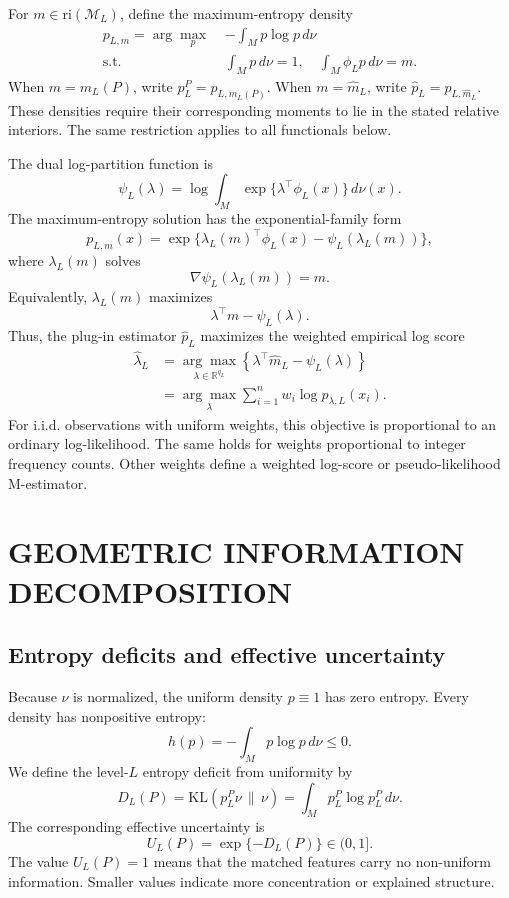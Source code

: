 \documentclass[twoside]{article}
\theoremstyle{definition}
\theoremstyle{remark}
\newcommand{\M}{\mathcal M}
\newcommand{\R}{\mathbb R}
\newcommand{\KL}{\mathrm{KL}}
\newcommand{\ri}{\mathrm{ri}}
\begin{document}
For $m\in\ri(\M_L)$, define the maximum-entropy density
\[
\begin{aligned}
  p_{L,m}
  =\arg\max_{p}\;& -\int_M p\log p\,d\nu \\
  \text{s.t. }& \int_M p\,d\nu=1,\quad
    \int_M \phi_Lp\,d\nu=m .
\end{aligned}
\]
When $m=m_L(P)$, write $p_L^P=p_{L,m_L(P)}$. When $m=\widehat m_L$, write $\widehat p_L=p_{L,\widehat m_L}$. These densities require their corresponding moments to lie in the stated relative interiors. The same restriction applies to all functionals below.

The dual log-partition function is
\[
  \psi_L(\lambda)=\log\int_M \exp\{\lambda^\top\phi_L(x)\}\,d\nu(x).
\]
The maximum-entropy solution has the exponential-family form
\[
  p_{L,m}(x)=\exp\{\lambda_L(m)^\top\phi_L(x)-\psi_L(\lambda_L(m))\},
\]
where $\lambda_L(m)$ solves
\[
  \nabla\psi_L(\lambda_L(m))=m.
\]
Equivalently, $\lambda_L(m)$ maximizes
\[
  \lambda^\top m-\psi_L(\lambda).
\]
Thus, the plug-in estimator $\widehat p_L$ maximizes the weighted empirical log score
\begin{align*}
  \widehat\lambda_L
  &= \underset{{\lambda\in\R^{q_L} }}{\arg\max}
  \left\{\lambda^\top\widehat m_L-\psi_L(\lambda)\right\} \\
  &=\underset{\lambda}{\arg\max}  \sum_{i=1}^n w_i\log p_{\lambda,L}(x_i).
\end{align*}
For i.i.d. observations with uniform weights, this objective is proportional to an ordinary log-likelihood. The same holds for weights proportional to integer frequency counts. Other weights define a weighted log-score or pseudo-likelihood M-estimator.





\section{GEOMETRIC INFORMATION DECOMPOSITION}

\subsection{Entropy deficits and effective uncertainty}

Because $\nu$ is normalized, the uniform density $p\equiv1$ has zero entropy. Every density has nonpositive entropy:
\[
  h(p)=-\int_M p\log p\,d\nu\le 0.
\]
We define the level-$L$ entropy deficit from uniformity by
\[
  D_L(P)=\KL(p_L^P\nu\,\|\,\nu)
  =\int_M p_L^P\log p_L^P\,d\nu.
\]
The corresponding effective uncertainty is
\[
  U_L(P)=\exp\{-D_L(P)\}\in(0,1].
\]
The value $U_L(P)=1$ means that the matched features carry no non-uniform information. Smaller values indicate more concentration or explained structure.
\end{document}

